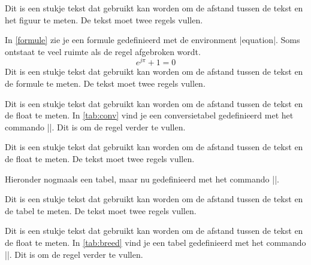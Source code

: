 \begin{llstShortInline}

Dit is een stukje tekst dat gebruikt kan worden om de afstand tussen de tekst en het figuur te meten. 
De tekst moet twee regels vullen.

\clearpage
In \cref{formule} zie je een formule gedefinieerd met de environment |equation|.
Soms ontstaat te veel ruimte als de regel  afgebroken wordt.
\begin{equation}
\label{formule}
e^{j\pi}+1=0
\end{equation} 
Dit is een stukje tekst dat gebruikt kan worden om de afstand tussen de tekst en de formule te meten. 
De tekst moet twee regels vullen.

\clearpage
Dit is een stukje tekst dat gebruikt kan worden om de afstand tussen de tekst en de float te meten. 
In \cref{tab:conv} vind je een conversietabel gedefinieerd met het commando |\tabel|. 
Dit is om de regel verder te vullen.


Dit is een stukje tekst dat gebruikt kan worden om de afstand tussen de tekst en de float te meten. 
De tekst moet twee regels vullen. 

Hieronder nogmaals een tabel, maar nu gedefinieerd met het commando |\tabel[H]|.


Dit is een stukje tekst dat gebruikt kan worden om de afstand tussen de tekst en de tabel te meten. 
De tekst moet twee regels vullen. 

\clearpage
Dit is een stukje tekst dat gebruikt kan worden om de afstand tussen de tekst en de float te meten. 
In \cref{tab:breed} vind je een tabel gedefinieerd met het commando |\tabelmaxpaginabreedgeschaald|. 
Dit is om de regel verder te vullen.


\end{llstShortInline}
